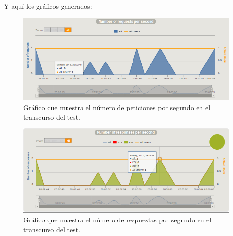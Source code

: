 \begin{itemize}
	Y aquí los gráficos generados:\\
	\begin{figure}[H]
		\centering
		\includegraphics[width=0.7\linewidth]{NumeroRequestGatling}
		\caption[Peticiones por segundo]{Gráfico que muestra el número de peticiones por segundo en el transcurso del test.}
		\label{fig:NumeroRequestGatling}
	\end{figure}
	\begin{figure}[H]
		\centering
		\includegraphics[width=0.7\linewidth]{NumeroRespuestasGatling}
		\caption[Respuestas gatling]{Gráfico que muestra el número de respuestas por segundo en el transcurso del test.}
		\label{fig:NumeroRespuestasGatling}
	\end{figure}
	
\end{itemize}
